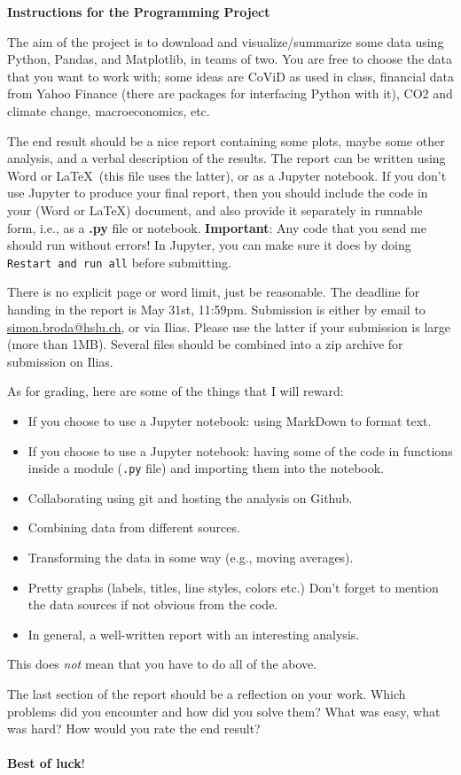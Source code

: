 \documentclass[11pt,a4paper]{article}
\begin{document}
\begin{center}
\bfseries\huge Instructions for the Programming Project
\end{center}
The aim of the project is to download and visualize/summarize some data using Python, Pandas, and Matplotlib, in teams of two. You are free to choose the data that you want to work with; some ideas are CoViD as used in class, financial data from Yahoo Finance (there are packages for interfacing Python with it), CO2 and climate change, macroeconomics, etc.

The end result should be a nice report containing some plots, maybe some other analysis, and a verbal description of the results. The report can be written using Word or \LaTeX\ (this file uses the latter), or as a Jupyter notebook. If you don't use Jupyter to produce your final report, then you should include the code in your (Word or \LaTeX) document, and also provide it separately in runnable form, i.e., as a \textbf{.py} file or notebook. \textbf{Important}: Any code that you send me should run without errors! In Jupyter, you can make sure it does by doing \texttt{Restart and run all} before submitting.

There is no explicit page or word limit, just be reasonable. The deadline for handing in the report is May 31st, 11:59pm. Submission is either by email to \href{mailto:simon.broda@hslu.ch}{simon.broda@hslu.ch}, or via Ilias. Please use the latter if your submission is large (more than 1MB). Several files should be combined into a zip archive for submission on Ilias.

As for grading, here are some of the things that I will reward:
\begin{itemize}
\item If you choose to use a Jupyter notebook: using MarkDown to format text.
\item If you choose to use a Jupyter notebook: having some of the code in functions inside a module (\texttt{.py} file) and importing them into the notebook.
\item Collaborating using git and hosting the analysis on Github.
\item Combining data from different sources.
\item Transforming the data in some way (e.g., moving averages).
\item Pretty graphs (labels, titles, line styles, colors etc.) Don't forget to mention the data sources if not obvious from the code.
\item In general, a well-written report with an interesting analysis.
\end{itemize}
This does \emph{not} mean that you have to do all of the above. 


The last section of the report should be a reflection on your work. Which problems did you encounter and how did you solve them? What was easy, what was hard? How would you rate the end result?\\\\
\noindent
\textbf{Best of luck}!
\end{document}
